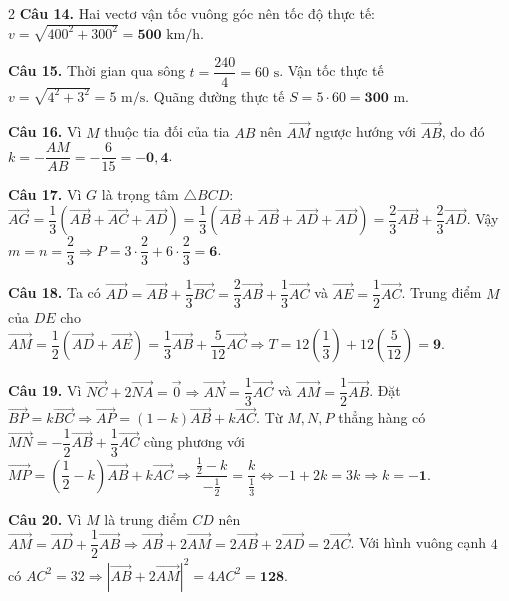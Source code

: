 \documentclass[12pt,a4paper]{article}
\begin{document}
\begin{multicols}{2}
\textbf{Câu 14.} Hai vectơ vận tốc vuông góc nên tốc độ thực tế: $v = \sqrt{400^2 + 300^2} = \mathbf{500}\text{ km/h}$.\par\vspace{3pt}

\textbf{Câu 15.} Thời gian qua sông $t = \dfrac{240}{4} = 60\text{ s}$. Vận tốc thực tế $v = \sqrt{4^2 + 3^2} = 5\text{ m/s}$. Quãng đường thực tế $S = 5 \cdot 60 = \mathbf{300}\text{ m}$.\par\vspace{3pt}

\textbf{Câu 16.} Vì $M$ thuộc tia đối của tia $AB$ nên $\vec{AM}$ ngược hướng với $\vec{AB}$, do đó $k = -\dfrac{AM}{AB} = -\dfrac{6}{15} = \mathbf{-0{,}4}$.\par\vspace{3pt}

\textbf{Câu 17.} Vì $G$ là trọng tâm $\triangle BCD$: $\vec{AG} = \dfrac{1}{3}(\vec{AB} + \vec{AC} + \vec{AD}) = \dfrac{1}{3}(\vec{AB} + \vec{AB} + \vec{AD} + \vec{AD}) = \dfrac{2}{3}\vec{AB} + \dfrac{2}{3}\vec{AD}$. Vậy $m = n = \dfrac{2}{3} \Rightarrow P = 3\cdot\dfrac{2}{3} + 6\cdot\dfrac{2}{3} = \mathbf{6}$.\par\vspace{3pt}

\textbf{Câu 18.} Ta có $\vec{AD} = \vec{AB} + \dfrac{1}{3}\vec{BC} = \dfrac{2}{3}\vec{AB} + \dfrac{1}{3}\vec{AC}$ và $\vec{AE} = \dfrac{1}{2}\vec{AC}$. Trung điểm $M$ của $DE$ cho $\vec{AM} = \dfrac{1}{2}(\vec{AD} + \vec{AE}) = \dfrac{1}{3}\vec{AB} + \dfrac{5}{12}\vec{AC} \Rightarrow T = 12\left(\dfrac{1}{3}\right) + 12\left(\dfrac{5}{12}\right) = \mathbf{9}$.\par\vspace{3pt}

\textbf{Câu 19.} Vì $\vec{NC} + 2\vec{NA} = \vec{0} \Rightarrow \vec{AN} = \dfrac{1}{3}\vec{AC}$ và $\vec{AM} = \dfrac{1}{2}\vec{AB}$. Đặt $\vec{BP} = k\vec{BC} \Rightarrow \vec{AP} = (1-k)\vec{AB} + k\vec{AC}$. Từ $M, N, P$ thẳng hàng có $\vec{MN} = -\dfrac{1}{2}\vec{AB} + \dfrac{1}{3}\vec{AC}$ cùng phương với $\vec{MP} = \left(\dfrac{1}{2}-k\right)\vec{AB} + k\vec{AC} \Rightarrow \dfrac{\frac{1}{2}-k}{-\frac{1}{2}} = \dfrac{k}{\frac{1}{3}} \Leftrightarrow -1 + 2k = 3k \Rightarrow k = \mathbf{-1}$.\par\vspace{3pt}

\textbf{Câu 20.} Vì $M$ là trung điểm $CD$ nên $\vec{AM} = \vec{AD} + \dfrac{1}{2}\vec{AB} \Rightarrow \vec{AB} + 2\vec{AM} = 2\vec{AB} + 2\vec{AD} = 2\vec{AC}$. Với hình vuông cạnh $4$ có $AC^2 = 32 \Rightarrow |\vec{AB} + 2\vec{AM}|^2 = 4AC^2 = \mathbf{128}$.\par\vspace{3pt}


\end{multicols}
\end{document}
